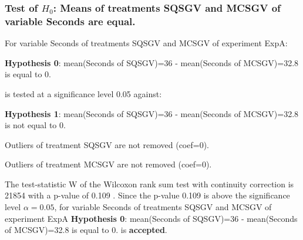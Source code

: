 \begin{frame}[t]
 \frametitle{Test of $H_{0}$: Means of treatments SQSGV and MCSGV of variable Seconds are equal. }
 \scriptsize
 For variable Seconds of treatments SQSGV and MCSGV of experiment ExpA:

\vspace{1mm}
{\bf Hypothesis 0}: mean(Seconds of SQSGV)=36 - mean(Seconds of MCSGV)=32.8 is equal to 0.


 \begin{center} is tested at a significance level 0.05 against: \end{center}

{\bf Hypothesis 1}: mean(Seconds of SQSGV)=36 - mean(Seconds of MCSGV)=32.8 is not equal to 0.
\vspace{1mm}
\vspace{1mm}

 Outliers of treatment SQSGV  are not removed (coef=0).

 Outliers of treatment MCSGV  are not removed (coef=0).
\vspace{1mm}
 
 The test-statistic W of the Wilcoxon rank sum test with continuity correction is 21854 with a p-value of 0.109 .
 Since the p-value 0.109 is above the significance level $\alpha= 0.05 $,
 for variable Seconds of treatments SQSGV and MCSGV of experiment ExpA 
 {\bf Hypothesis 0}: mean(Seconds of SQSGV)=36 - mean(Seconds of MCSGV)=32.8 is equal to 0.
is {\bf accepted}.

 \end{frame}
